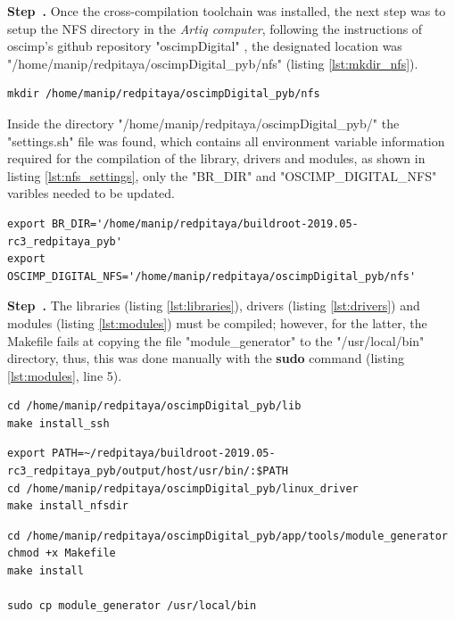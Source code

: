\documentclass[a4paper,12pt]{article}
\newcounter{step}
\newenvironment{step}[1][]{\refstepcounter{step}\par\medskip
	\textbf{Step~\thestep. #1} \rmfamily }{\medskip}
\begin{document}
\begin{step}
Once the cross-compilation toolchain was installed, the next step was to setup the NFS directory in the \textit{Artiq computer}, following the instructions of oscimp's github repository "oscimpDigital" \cite{oscimp}, the designated location was "/home/manip/redpitaya/oscimpDigital\_pyb/nfs" (listing \ref{lst:mkdir_nfs}).

\begin{lstlisting}[style=bash,label={lst:mkdir_nfs},caption={Creating NFS directory.}]
mkdir /home/manip/redpitaya/oscimpDigital_pyb/nfs
\end{lstlisting}

Inside the directory "/home/manip/redpitaya/oscimpDigital\_pyb/" the "settings.sh" file was found, which contains all environment variable information required for the compilation of the library, drivers and modules, as shown in listing \ref{lst:nfs_settings}, only the "BR\_DIR" and "OSCIMP\_DIGITAL\_NFS" varibles needed to be updated.

\begin{lstlisting}[style=bash,label={lst:nfs_settings},caption={Updating variables "settings.sh" file.}]
export BR_DIR='/home/manip/redpitaya/buildroot-2019.05-rc3_redpitaya_pyb'
export OSCIMP_DIGITAL_NFS='/home/manip/redpitaya/oscimpDigital_pyb/nfs'
\end{lstlisting}

\end{step}

\begin{step}
The libraries (listing \ref{lst:libraries}), drivers (listing \ref{lst:drivers}) and modules (listing \ref{lst:modules}) must be compiled; however, for the latter, the Makefile fails at copying the file "module\_generator" to the "/usr/local/bin" directory, thus, this was done manually with the \textbf{sudo} command (listing \ref{lst:modules}, line 5).

\begin{lstlisting}[style=bash,label={lst:libraries},caption={Compiling the libraries.}]
cd /home/manip/redpitaya/oscimpDigital_pyb/lib
make install_ssh
\end{lstlisting}

\begin{lstlisting}[style=bash,label={lst:drivers},caption={Installing the drivers.}]
export PATH=~/redpitaya/buildroot-2019.05-rc3_redpitaya_pyb/output/host/usr/bin/:$PATH
cd /home/manip/redpitaya/oscimpDigital_pyb/linux_driver
make install_nfsdir
\end{lstlisting}

\begin{lstlisting}[style=bash,label={lst:modules},caption={Compiling the module generator tool.}]
cd /home/manip/redpitaya/oscimpDigital_pyb/app/tools/module_generator
chmod +x Makefile
make install

sudo cp module_generator /usr/local/bin
\end{lstlisting}

\end{step}
\end{document}
